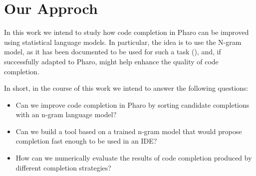 \section{Our Approch}
\label{sec:Introduction-Approach}
 In this work we intend to study how code completion in Pharo can be improved using statistical language models. In particular, the idea is to use the N-gram model, as it has been documented to be used for such a task (\cite{Hind12a}), and, if successfully adapted to Pharo, might help enhance the quality of code completion.

 In short, in the course of this work we intend to answer the following questions:
 \begin{itemize}
     \item Can we improve code completion in Pharo by sorting candidate completions with an n-gram language model?
     \item Can we build a tool based on a trained n-gram model that would propose completion fast enough to be used in an IDE?
     \item How can we numerically evaluate the results of code completion produced by different completion strategies?
 \end{itemize}
 